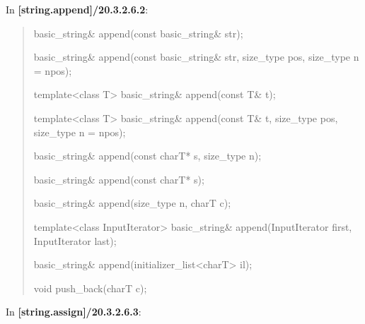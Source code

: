 \documentclass{wg21}
\begin{document}
In \textbf{[string.append]/20.3.2.6.2}:
\begin{quote}
\begin{itemdecl}
basic_string& append(const basic_string& str);
\end{itemdecl}

\begin{itemdecl}
basic_string& append(const basic_string& str, size_type pos, size_type n = npos);
\end{itemdecl}

\begin{itemdecl}
template<class T>
  basic_string& append(const T& t);
\end{itemdecl}

\begin{itemdecl}
template<class T>
  basic_string& append(const T& t, size_type pos, size_type n = npos);
\end{itemdecl}

\begin{itemdecl}
basic_string& append(const charT* s, size_type n);
\end{itemdecl}

\begin{itemdecl}
basic_string& append(const charT* s);
\end{itemdecl}

\begin{itemdecl}
basic_string& append(size_type n, charT c);
\end{itemdecl}

\begin{itemdecl}
template<class InputIterator>
  basic_string& append(InputIterator first, InputIterator last);
\end{itemdecl}

\begin{itemdecl}
basic_string& append(initializer_list<charT> il);
\end{itemdecl}

\begin{itemdecl}
void push_back(charT c);
\end{itemdecl}
\end{quote}


In \textbf{[string.assign]/20.3.2.6.3}:
\end{document}
